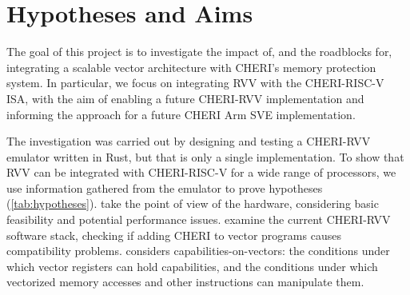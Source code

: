 

\section{Hypotheses and Aims}
The goal of this project is to investigate the impact of, and the roadblocks for, integrating a scalable vector architecture with CHERI's memory protection system.
In particular, we focus on integrating RVV with the CHERI-RISC-V ISA, with the aim of enabling a future CHERI-RVV implementation and informing the approach for a future CHERI Arm SVE implementation.

The investigation was carried out by designing and testing a CHERI-RVV emulator written in Rust, but that is only a single implementation.
To show that RVV can be integrated with CHERI-RISC-V for a wide range of processors, we use information gathered from the emulator to prove  hypotheses (\cref{tab:hypotheses}).
 take the point of view of the hardware, considering basic feasibility and potential performance issues.
 examine the current CHERI-RVV software stack, checking if adding CHERI to vector programs causes compatibility problems.
 considers capabilities-on-vectors: the conditions under which vector registers can hold capabilities, and the conditions under which vectorized memory accesses and other instructions can manipulate them.

